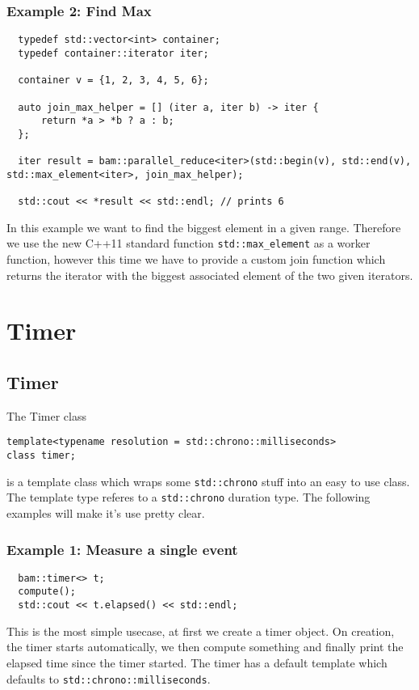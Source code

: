 \documentclass[11pt, a4paper]{article}
\begin{document}
\subsubsection{Example 2: Find Max}
\begin{lstlisting}
  typedef std::vector<int> container;
  typedef container::iterator iter;

  container v = {1, 2, 3, 4, 5, 6};

  auto join_max_helper = [] (iter a, iter b) -> iter {
      return *a > *b ? a : b;
  };

  iter result = bam::parallel_reduce<iter>(std::begin(v), std::end(v), std::max_element<iter>, join_max_helper);

  std::cout << *result << std::endl; // prints 6
\end{lstlisting}

In this example we want to find the biggest element in a given range. Therefore we use the new C++11 standard function \texttt{std::max\_element} as a worker function, however this time we have to provide a custom join function which returns the iterator with the biggest associated element of the two given iterators.

\section{Timer}
\subsection{Timer}

The Timer class 
\begin{lstlisting}
template<typename resolution = std::chrono::milliseconds>
class timer;
\end{lstlisting}

 is a template class which wraps some \texttt{std::chrono} stuff into an easy to use class. The template type referes to a \texttt{std::chrono} duration type. The following examples  will make it's use pretty clear.
\subsubsection{Example 1: Measure a single event}
\begin{lstlisting}
  bam::timer<> t;
  compute();
  std::cout << t.elapsed() << std::endl;
\end{lstlisting}

This is the most simple usecase, at first we create a timer object. On creation, the timer starts automatically, we then compute something and finally print the elapsed time since the timer started. The timer has a default template which defaults to \texttt{std::chrono::milliseconds}.
\end{document}
